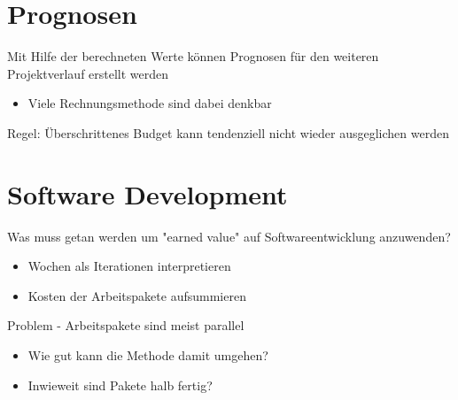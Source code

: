 \documentclass{f4_beamer}
\begin{document}
\section{Prognosen}
\begin{frame}[fragile]
    Mit Hilfe der berechneten Werte können Prognosen für den weiteren Projektverlauf erstellt werden
    \begin{itemize}
        \item Viele Rechnungsmethode sind dabei denkbar
    \end{itemize}
    Regel: Überschrittenes Budget kann tendenziell nicht wieder ausgeglichen werden
\end{frame}


\section{Software Development}
\begin{frame}[fragile]
    Was muss getan werden um "earned value" auf Softwareentwicklung anzuwenden?
    \begin{itemize}
        \item Wochen als Iterationen interpretieren
        \item Kosten der Arbeitspakete aufsummieren
    \end{itemize}
\end{frame}
\begin{frame}[fragile]
    Problem - Arbeitspakete sind meist parallel
    \begin{itemize}
        \item Wie gut kann die Methode damit umgehen?
        \item Inwieweit sind Pakete halb fertig?
    \end{itemize}
\end{frame}
\end{document}

